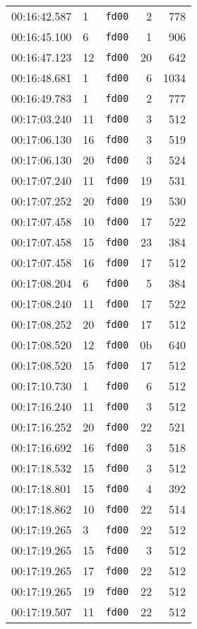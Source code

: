 \documentclass{article}
\begin{document}
\begin{longtable}{lllrr}
00:16:42.587 & 1 & \texttt{fd00} & 2 & 778 \\
00:16:45.100 & 6 & \texttt{fd00} & 1 & 906 \\
00:16:47.123 & 12 & \texttt{fd00} & 20 & 642 \\
00:16:48.681 & 1 & \texttt{fd00} & 6 & 1034 \\
00:16:49.783 & 1 & \texttt{fd00} & 2 & 777 \\
00:17:03.240 & 11 & \texttt{fd00} & 3 & 512 \\
00:17:06.130 & 16 & \texttt{fd00} & 3 & 519 \\
00:17:06.130 & 20 & \texttt{fd00} & 3 & 524 \\
00:17:07.240 & 11 & \texttt{fd00} & 19 & 531 \\
00:17:07.252 & 20 & \texttt{fd00} & 19 & 530 \\
00:17:07.458 & 10 & \texttt{fd00} & 17 & 522 \\
00:17:07.458 & 15 & \texttt{fd00} & 23 & 384 \\
00:17:07.458 & 16 & \texttt{fd00} & 17 & 512 \\
00:17:08.204 & 6 & \texttt{fd00} & 5 & 384 \\
00:17:08.240 & 11 & \texttt{fd00} & 17 & 522 \\
00:17:08.252 & 20 & \texttt{fd00} & 17 & 512 \\
00:17:08.520 & 12 & \texttt{fd00} & 0b & 640 \\
00:17:08.520 & 15 & \texttt{fd00} & 17 & 512 \\
00:17:10.730 & 1 & \texttt{fd00} & 6 & 512 \\
00:17:16.240 & 11 & \texttt{fd00} & 3 & 512 \\
00:17:16.252 & 20 & \texttt{fd00} & 22 & 521 \\
00:17:16.692 & 16 & \texttt{fd00} & 3 & 518 \\
00:17:18.532 & 15 & \texttt{fd00} & 3 & 512 \\
00:17:18.801 & 15 & \texttt{fd00} & 4 & 392 \\
00:17:18.862 & 10 & \texttt{fd00} & 22 & 514 \\
00:17:19.265 & 3 & \texttt{fd00} & 22 & 512 \\
00:17:19.265 & 15 & \texttt{fd00} & 3 & 512 \\
00:17:19.265 & 17 & \texttt{fd00} & 22 & 512 \\
00:17:19.265 & 19 & \texttt{fd00} & 22 & 512 \\
00:17:19.507 & 11 & \texttt{fd00} & 22 & 512 \\

\end{longtable}
\end{document}
